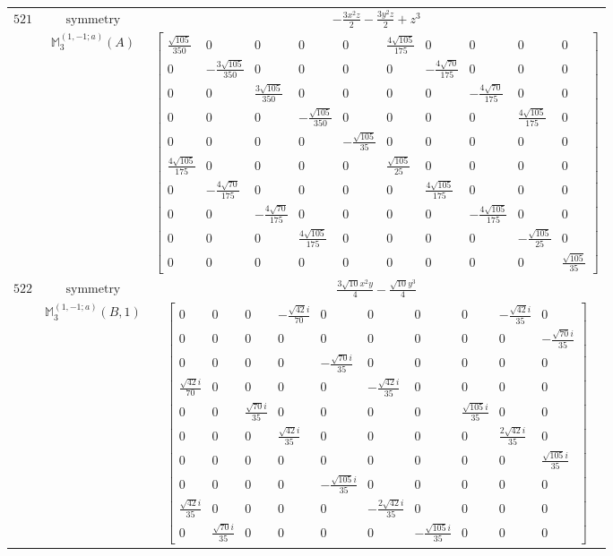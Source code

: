 \documentclass[fleqn,8pt,landscape]{jsarticle}
\begin{document}
\begin{longtable}{ccc}
$ 521 $ & $ \text{symmetry} $ & $ - \frac{3 x^{2} z}{2} - \frac{3 y^{2} z}{2} + z^{3} $ \\
$  $ & $ \mathbb{M}_{3}^{(1,-1;a)}(A) $ & $ \begin{bmatrix} \frac{\sqrt{105}}{350} & 0 & 0 & 0 & 0 & \frac{4 \sqrt{105}}{175} & 0 & 0 & 0 & 0 \\ 0 & - \frac{3 \sqrt{105}}{350} & 0 & 0 & 0 & 0 & - \frac{4 \sqrt{70}}{175} & 0 & 0 & 0 \\ 0 & 0 & \frac{3 \sqrt{105}}{350} & 0 & 0 & 0 & 0 & - \frac{4 \sqrt{70}}{175} & 0 & 0 \\ 0 & 0 & 0 & - \frac{\sqrt{105}}{350} & 0 & 0 & 0 & 0 & \frac{4 \sqrt{105}}{175} & 0 \\ 0 & 0 & 0 & 0 & - \frac{\sqrt{105}}{35} & 0 & 0 & 0 & 0 & 0 \\ \frac{4 \sqrt{105}}{175} & 0 & 0 & 0 & 0 & \frac{\sqrt{105}}{25} & 0 & 0 & 0 & 0 \\ 0 & - \frac{4 \sqrt{70}}{175} & 0 & 0 & 0 & 0 & \frac{4 \sqrt{105}}{175} & 0 & 0 & 0 \\ 0 & 0 & - \frac{4 \sqrt{70}}{175} & 0 & 0 & 0 & 0 & - \frac{4 \sqrt{105}}{175} & 0 & 0 \\ 0 & 0 & 0 & \frac{4 \sqrt{105}}{175} & 0 & 0 & 0 & 0 & - \frac{\sqrt{105}}{25} & 0 \\ 0 & 0 & 0 & 0 & 0 & 0 & 0 & 0 & 0 & \frac{\sqrt{105}}{35} \end{bmatrix} $ \\ \hline
$ 522 $ & $ \text{symmetry} $ & $ \frac{3 \sqrt{10} x^{2} y}{4} - \frac{\sqrt{10} y^{3}}{4} $ \\
$  $ & $ \mathbb{M}_{3}^{(1,-1;a)}(B,1) $ & $ \begin{bmatrix} 0 & 0 & 0 & - \frac{\sqrt{42} i}{70} & 0 & 0 & 0 & 0 & - \frac{\sqrt{42} i}{35} & 0 \\ 0 & 0 & 0 & 0 & 0 & 0 & 0 & 0 & 0 & - \frac{\sqrt{70} i}{35} \\ 0 & 0 & 0 & 0 & - \frac{\sqrt{70} i}{35} & 0 & 0 & 0 & 0 & 0 \\ \frac{\sqrt{42} i}{70} & 0 & 0 & 0 & 0 & - \frac{\sqrt{42} i}{35} & 0 & 0 & 0 & 0 \\ 0 & 0 & \frac{\sqrt{70} i}{35} & 0 & 0 & 0 & 0 & \frac{\sqrt{105} i}{35} & 0 & 0 \\ 0 & 0 & 0 & \frac{\sqrt{42} i}{35} & 0 & 0 & 0 & 0 & \frac{2 \sqrt{42} i}{35} & 0 \\ 0 & 0 & 0 & 0 & 0 & 0 & 0 & 0 & 0 & \frac{\sqrt{105} i}{35} \\ 0 & 0 & 0 & 0 & - \frac{\sqrt{105} i}{35} & 0 & 0 & 0 & 0 & 0 \\ \frac{\sqrt{42} i}{35} & 0 & 0 & 0 & 0 & - \frac{2 \sqrt{42} i}{35} & 0 & 0 & 0 & 0 \\ 0 & \frac{\sqrt{70} i}{35} & 0 & 0 & 0 & 0 & - \frac{\sqrt{105} i}{35} & 0 & 0 & 0 \end{bmatrix} $ \\ \hline

\end{longtable}
\end{document}
